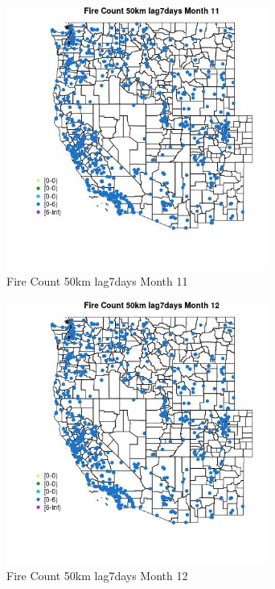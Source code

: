\begin{figure} 
\centering  
\includegraphics[width=0.77\textwidth]{Code_Outputs/Report_ML_input_PM25_Step4_part_e_de_duplicated_aves_compiled_2019-05-21wNAs_MapObsMo11Fire_Count_50km_lag7days.jpg} 
\caption{\label{fig:Report_ML_input_PM25_Step4_part_e_de_duplicated_aves_compiled_2019-05-21wNAsMapObsMo11Fire_Count_50km_lag7days}Fire Count 50km lag7days Month 11} 
\end{figure} 
 

\begin{figure} 
\centering  
\includegraphics[width=0.77\textwidth]{Code_Outputs/Report_ML_input_PM25_Step4_part_e_de_duplicated_aves_compiled_2019-05-21wNAs_MapObsMo12Fire_Count_50km_lag7days.jpg} 
\caption{\label{fig:Report_ML_input_PM25_Step4_part_e_de_duplicated_aves_compiled_2019-05-21wNAsMapObsMo12Fire_Count_50km_lag7days}Fire Count 50km lag7days Month 12} 
\end{figure} 
 

